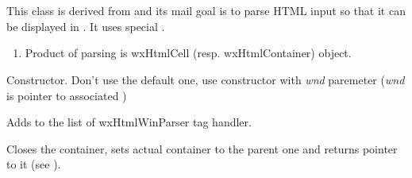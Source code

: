%
%


\section{}\label{wxhtmlwinparser}

This class is derived from  and
its mail goal is to parse HTML input so that it can be displayed in
. It uses special
.


\begin{enumerate}
\item Product of parsing is wxHtmlCell (resp. wxHtmlContainer) object.
\end{enumerate}






\label{wxhtmlwinparserwxhtmlwinparser}



Constructor. Don't use the default one, use constructor with
{\it wnd} paremeter ({\it wnd} is pointer to associated )

\label{wxhtmlwinparseraddmodule}


Adds  to the list of wxHtmlWinParser tag handler.

\label{wxhtmlwinparserclosecontainer}


Closes the container, sets actual container to the parent one
and returns pointer to it (see ).

\label{wxhtmlwinparsercreatecurrentfont}

